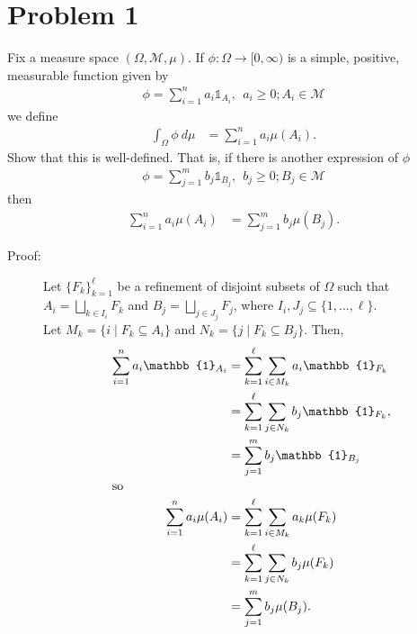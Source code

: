 \documentclass[10pt]{extarticle}
\title{}
\author{}
\date{}
\begin{document}
  \section{Problem 1}%
  Fix a measure space $(\Omega,\mathcal{M},\mu)$. If $\phi: \Omega \rightarrow [0,\infty)$ is a simple, positive, measurable function given by
  \begin{align*}
    \phi = \sum_{i=1}^{n}a_i\mathbb{1}_{A_i},~~a_i\geq 0;A_i\in \mathcal{M}
  \end{align*}
  we define
  \begin{align*}
    \int_{\Omega}\phi~d\mu &= \sum_{i=1}^{n}a_i\mu(A_i).
  \end{align*}
  Show that this is well-defined. That is, if there is another expression of $\phi$
  \begin{align*}
    \phi = \sum_{j=1}^{m}b_j\mathbb{1}_{B_j},~~b_j\geq 0;B_j\in \mathcal{M}
  \end{align*}
  then
  \begin{align*}
    \sum_{i=1}^{n}a_i\mu(A_i) &= \sum_{j=1}^{m}b_j\mu(B_j).
  \end{align*}
  \begin{description}
    \item[Proof:] Let $\{F_k\}_{k=1}^{\ell}$ be a refinement of disjoint subsets of $\Omega$ such that $\displaystyle A_i = \bigsqcup_{k\in I_i}F_k$ and $\displaystyle B_j = \bigsqcup_{j\in J_j}F_j$, where $I_i,J_j\subseteq \{1,\dots,\ell\}$.\\

      Let $M_k = \{i\mid F_k\subseteq A_i\}$ and $N_k = \{j\mid F_k\subseteq B_j\}$. Then,
      \begin{align*}
        \sum_{i=1}^{n}a_i\mathbb{1}_{A_i} &= \sum_{k=1}^{\ell}\sum_{i\in M_k}a_i\mathbb{1}_{F_k}\\
                                          &= \sum_{k=1}^{\ell}\sum_{j\in N_k} b_j\mathbb{1}_{F_k},\\
                                          &= \sum_{j=1}^{m}b_j\mathbb{1}_{B_j}\\
                                          \intertext{so}
        \sum_{i=1}^{n}a_i\mu(A_i) &= \sum_{k=1}^{\ell}\sum_{i\in M_k}a_k\mu(F_k)\\
                                  &= \sum_{k=1}^{\ell}\sum_{j\in N_k}b_j\mu(F_k)\\
                                  &= \sum_{j=1}^{m}b_j\mu(B_j).
      \end{align*}
  \end{description}
\end{document}
